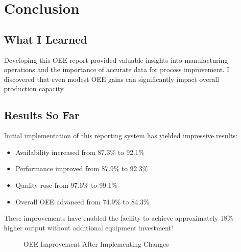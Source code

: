 \documentclass{article}
\begin{document}
\section{Conclusion}

\subsection{What I Learned}
Developing this OEE report provided valuable insights into manufacturing operations and the importance of accurate data for process improvement. I discovered that even modest OEE gains can significantly impact overall production capacity.

\subsection{Results So Far}
Initial implementation of this reporting system has yielded impressive results:

\begin{itemize}
    \item Availability increased from 87.3\% to 92.1\%
    \item Performance improved from 87.9\% to 92.3\%
    \item Quality rose from 97.6\% to 99.1\%
    \item Overall OEE advanced from 74.9\% to 84.3\%
\end{itemize}

These improvements have enabled the facility to achieve approximately 18\% higher output without additional equipment investment!

\begin{figure}[H]
\centering
{}
\caption{OEE Improvement After Implementing Changes}
\end{figure}
\end{document}
